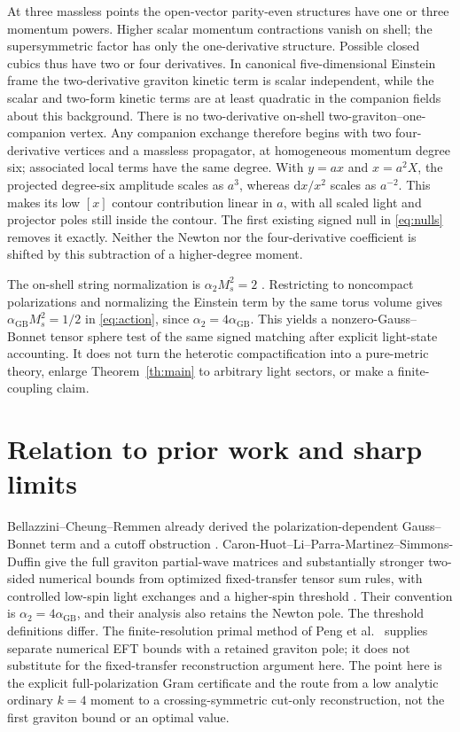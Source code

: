 \documentclass[11pt,a4paper]{article}
\theoremstyle{definition}
\theoremstyle{remark}
\newcommand{\dS}{\mathrm{d}}
\newcommand{\GB}{\alpha_{\mathrm{GB}}}
\begin{document}
At three massless points the open-vector parity-even structures have one or three momentum powers. Higher scalar momentum contractions vanish on shell; the supersymmetric factor has only the one-derivative structure. Possible closed cubics thus have two or four derivatives. In canonical five-dimensional Einstein frame the two-derivative graviton kinetic term is scalar independent, while the scalar and two-form kinetic terms are at least quadratic in the companion fields about this background. There is no two-derivative on-shell two-graviton--one-companion vertex. Any companion exchange therefore begins with two four-derivative vertices and a massless propagator, at homogeneous momentum degree six; associated local terms have the same degree. With $y=ax$ and $x=a^2 X$, the projected degree-six amplitude scales as $a^3$, whereas $\dS x/x^2$ scales as $a^{-2}$. This makes its low $[x]$ contour contribution linear in $a$, with all scaled light and projector poles still inside the contour. The first existing signed null in \eqref{eq:nulls} removes it exactly. Neither the Newton nor the four-derivative coefficient is shifted by this subtraction of a higher-degree moment.

The on-shell string normalization is $\alpha_2 M_s^2=2$ \cite[Table~1]{CHLi}. Restricting to noncompact polarizations and normalizing the Einstein term by the same torus volume gives $\GB M_s^2=1/2$ in \eqref{eq:action}, since $\alpha_2=4\GB$. This yields a nonzero-Gauss--Bonnet tensor sphere test of the same signed matching after explicit light-state accounting. It does not turn the heterotic compactification into a pure-metric theory, enlarge Theorem~\ref{th:main} to arbitrary light sectors, or make a finite-coupling claim.

\section{Relation to prior work and sharp limits}\label{sec:scope}
Bellazzini--Cheung--Remmen already derived the polarization-dependent Gauss--Bonnet term and a cutoff obstruction \cite{BCR}. Caron-Huot--Li--Parra-Martinez--Simmons-Duffin give the full graviton partial-wave matrices and substantially stronger two-sided numerical bounds from optimized fixed-transfer tensor sum rules, with controlled low-spin light exchanges and a higher-spin threshold \cite{CHLPS}. Their convention is $\alpha_2=4\GB$, and their analysis also retains the Newton pole. The threshold definitions differ. The finite-resolution primal method of Peng et al.\ \cite{Peng} supplies separate numerical EFT bounds with a retained graviton pole; it does not substitute for the fixed-transfer reconstruction argument here. The point here is the explicit full-polarization Gram certificate and the route from a low analytic ordinary $k=4$ moment to a crossing-symmetric cut-only reconstruction, not the first graviton bound or an optimal value.
\end{document}
